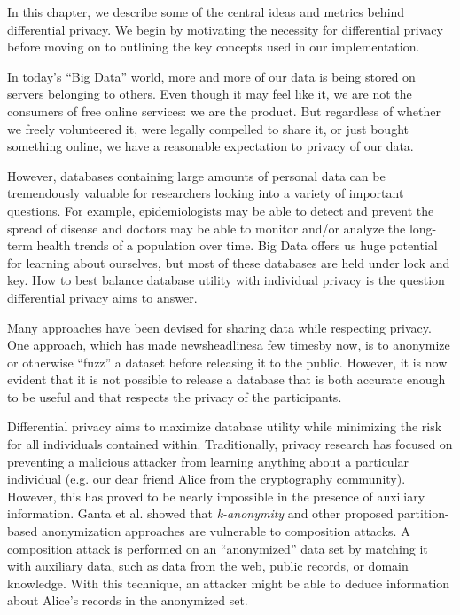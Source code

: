 \documentclass[12pt]{report}
\begin{document}
In this chapter, we describe some of the central ideas and metrics behind differential privacy.
We begin by motivating the necessity for differential privacy before moving on to outlining the key concepts used in our implementation.

In today's ``Big Data'' world, more and more of our data is being stored on servers belonging to others.
Even though it may feel like it, we are not the consumers of free online services: we are the product.
But regardless of whether we freely volunteered it, were legally compelled to share it, or just bought something online, we have a reasonable expectation to privacy of our data.

However, databases containing large amounts of personal data can be tremendously valuable for researchers looking into a variety of important questions.
For example, epidemiologists may be able to detect and prevent the spread of disease and doctors may be able to monitor and/or analyze the long-term health trends of a population over time.
Big Data offers us huge potential for learning about ourselves, but most of these databases are held under lock and key.
How to best balance database utility with individual privacy is the question differential privacy aims to answer.

Many approaches have been devised for sharing data while respecting privacy.
One approach, which has made news\footnotemark[\ref{fn:aol}] headlines\footnotemark[\ref{fn:twitter}] a few times\footnotemark[\ref{fn:netflix}] by now\footnotemark[\ref{fn:gic}], is to anonymize or otherwise ``fuzz'' a dataset before releasing it to the public.
However, it is now evident that it is not possible to release a database that is both accurate enough to be useful and that respects the privacy of the participants\cite{journals/cacm/Dwork11}.

Differential privacy aims to maximize database utility while minimizing the risk for all individuals contained within\cite{journals/cacm/Dwork11}.
Traditionally, privacy research has focused on preventing a malicious attacker from learning anything about a particular individual (e.g. our dear friend Alice from the cryptography community).
However, this has proved to be nearly impossible in the presence of auxiliary information.
Ganta et al. showed that \textit{k-anonymity} and other proposed partition-based anonymization approaches are vulnerable to composition attacks\cite{ganta2008composition}.
A composition attack is performed on an ``anonymized'' data set by matching it with auxiliary data, such as data from the web, public records, or domain knowledge.
With this technique, an attacker might be able to deduce information about Alice's records in the anonymized set.
\end{document}
